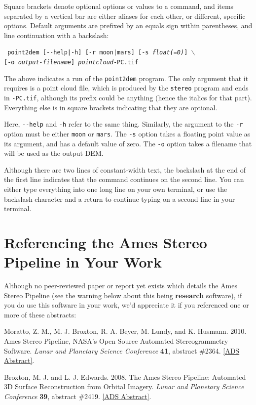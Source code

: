 Square brackets denote optional options or values to a command, and
items separated by a vertical bar are either aliases for each other, or
different, specific options.  Default arguments are prefixed by an equals
sign within parentheses, and line continuation with a backslash:

\texttt{  point2dem [-\/-help|-h] [-r moon|mars] [-s \textit{float(=0)}] $\backslash$ } \\
\hspace*{6em}\texttt{[-o \textit{output-filename}] \textit{pointcloud}-PC.tif}

The above indicates a run of the \texttt{point2dem} program.  The
only argument that it requires is a point cloud file, which is
produced by the \texttt{stereo} program and ends in \texttt{-PC.tif},
although its prefix could be anything (hence the italics for that
part).  Everything else is in square brackets indicating that they
are optional.

Here, \texttt{-\/-help} and \texttt{-h} refer to the same
thing. Similarly, the argument to the \texttt{-r} option must be either
\texttt{moon} or \texttt{mars}.  The \texttt{-s} option takes a floating
point value as its argument, and has a default value of zero.  The
\texttt{-o} option takes a filename that will be used as the output
\ac{DEM}.

Although there are two lines of constant-width text, the backslash at
the end of the first line indicates that the command continues on the
second line. You can either type everything into one long line on your
own terminal, or use the backslash character and a return to continue
typing on a second line in your terminal.


\section{Referencing the Ames Stereo Pipeline in Your Work}

Although no peer-reviewed paper or report yet exists which details the
Ames Stereo Pipeline (see the warning below about this being {\bf
  research} software), if you do use this software in your work, we'd
appreciate it if you referenced one or more of these abstracts:

\begin{description}
\item Moratto, Z. M., M. J. Broxton, R. A. Beyer, M. Lundy, and K. Husmann.
2010. Ames Stereo Pipeline, NASA's Open Source Automated Stereogrammetry
Software. \textit{Lunar and Planetary Science Conference} \textbf{41},
abstract \#2364.
\href{http://adsabs.harvard.edu/abs/2010LPI....41.2364M}{[ADS Abstract]}.

\item Broxton, M. J. and L. J. Edwards. 2008. The Ames Stereo Pipeline:
Automated 3D Surface Reconstruction from Orbital Imagery. \textit{Lunar
and Planetary Science Conference} \textbf{39}, abstract \#2419.
\href{http://adsabs.harvard.edu/abs/2008LPI....39.2419B}{[ADS Abstract]}.
\end{description}

